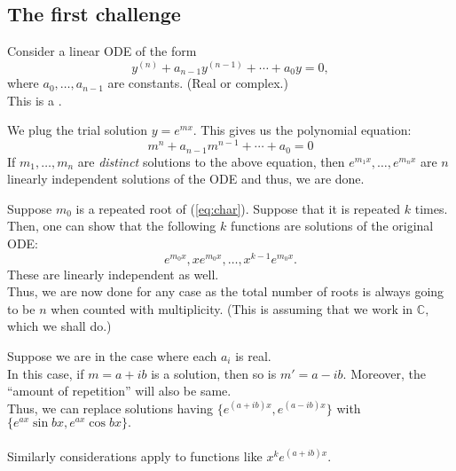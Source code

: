 \subsection{The first challenge} \label{ssec:undcoeffhomo}
\begin{mdframed}[style=boxstyle, frametitle={The Setup}]
	Consider a linear ODE of the form
	\begin{equation}\label{eq:const}
		y^{(n)} + a_{n-1}y^{(n - 1)} + \cdots + a_0y = 0,
	\end{equation}
	where $a_0, \ldots, a_{n-1}$ are constants. (Real or complex.)\\
	This is a .
\end{mdframed}
\begin{mdframed}[style=boxstyle, frametitle={Solving it}]
	We plug the trial solution $y = e^{mx}.$ This gives us the polynomial equation:
	\begin{equation}\label{eq:char}
		m^n + a_{n-1}m^{n-1} + \cdots + a_0 = 0
	\end{equation}
	If $m_1, \ldots, m_n$ are \emph{distinct} solutions to the above equation, then $e^{m_1x}, \ldots, e^{m_nx}$ are $n$ linearly independent solutions of the ODE and thus, we are done.
\end{mdframed}
\begin{mdframed}[style=boxstyle, frametitle={Repeated roots}]
	Suppose $m_0$ is a repeated root of (\ref{eq:char}). Suppose that it is repeated $k$ times. Then, one can show that the following $k$ functions are solutions of the original ODE:
	\begin{equation*} 
		e^{m_0x}, xe^{m_0x}, \ldots, x^{k-1}e^{m_0x}.
	\end{equation*}
	These are linearly independent as well.\\
	Thus, we are now done for any case as the total number of roots is always going to be $n$ when counted with multiplicity. (This is assuming that we work in $\mathbb{C},$ which we shall do.)
\end{mdframed}
\begin{mdframed}[style=boxstyle, frametitle={Getting real}]
	Suppose we are in the case where each $a_i$ is real.\\
	In this case, if $m = a + ib$ is a solution, then so is $m' = a - ib.$ Moreover, the ``amount of repetition'' will also be same.\\
	Thus, we can replace solutions having $\{e^{(a + ib)x}, e^{(a - ib)x}\}$ with \\
	$\{e^{ax}\sin bx, e^{ax}\cos bx\}.$\\~\\
	Similarly considerations apply to functions like $x^ke^{(a + ib)x}.$
\end{mdframed}
